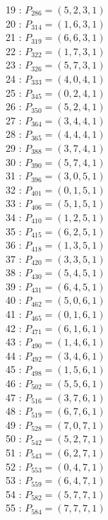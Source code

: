 \documentclass{article}
\begin{document}
{\begin{multicols}{2}
19 : $P_{286}=( 5, 2, 3, 1 )$\\
20 : $P_{314}=( 1, 6, 3, 1 )$\\
21 : $P_{319}=( 6, 6, 3, 1 )$\\
22 : $P_{322}=( 1, 7, 3, 1 )$\\
23 : $P_{326}=( 5, 7, 3, 1 )$\\
24 : $P_{333}=( 4, 0, 4, 1 )$\\
25 : $P_{345}=( 0, 2, 4, 1 )$\\
26 : $P_{350}=( 5, 2, 4, 1 )$\\
27 : $P_{364}=( 3, 4, 4, 1 )$\\
28 : $P_{365}=( 4, 4, 4, 1 )$\\
29 : $P_{388}=( 3, 7, 4, 1 )$\\
30 : $P_{390}=( 5, 7, 4, 1 )$\\
31 : $P_{396}=( 3, 0, 5, 1 )$\\
32 : $P_{401}=( 0, 1, 5, 1 )$\\
33 : $P_{406}=( 5, 1, 5, 1 )$\\
34 : $P_{410}=( 1, 2, 5, 1 )$\\
35 : $P_{415}=( 6, 2, 5, 1 )$\\
36 : $P_{418}=( 1, 3, 5, 1 )$\\
37 : $P_{420}=( 3, 3, 5, 1 )$\\
38 : $P_{430}=( 5, 4, 5, 1 )$\\
39 : $P_{431}=( 6, 4, 5, 1 )$\\
40 : $P_{462}=( 5, 0, 6, 1 )$\\
41 : $P_{465}=( 0, 1, 6, 1 )$\\
42 : $P_{471}=( 6, 1, 6, 1 )$\\
43 : $P_{490}=( 1, 4, 6, 1 )$\\
44 : $P_{492}=( 3, 4, 6, 1 )$\\
45 : $P_{498}=( 1, 5, 6, 1 )$\\
46 : $P_{502}=( 5, 5, 6, 1 )$\\
47 : $P_{516}=( 3, 7, 6, 1 )$\\
48 : $P_{519}=( 6, 7, 6, 1 )$\\
49 : $P_{528}=( 7, 0, 7, 1 )$\\
50 : $P_{542}=( 5, 2, 7, 1 )$\\
51 : $P_{543}=( 6, 2, 7, 1 )$\\
52 : $P_{553}=( 0, 4, 7, 1 )$\\
53 : $P_{559}=( 6, 4, 7, 1 )$\\
54 : $P_{582}=( 5, 7, 7, 1 )$\\
55 : $P_{584}=( 7, 7, 7, 1 )$\\
\end{multicols}
}
\end{document}
